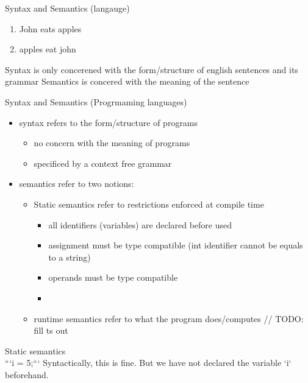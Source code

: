 \documentclass[journal, letterpaper]{IEEEtran}
\begin{document}
\begin{aside}{Syntax and Semantics (langauge)} \\
    \begin{enumerate}
        \item John eats apples
        \item apples eat john
    \end{enumerate}

    Syntax is only concerened with the form/structure of english sentences and its grammar
    Semantics is concered with the meaning of the sentence
\end{aside}

\begin{theory}{Syntax and Semantics (Progrmaming languages)}\\
    \begin{itemize}
        \item syntax refers to the form/structure of programs
        \begin{itemize}
            \item no concern with the meaning of programs
            \item specificed by a context free grammar
        \end{itemize}
    \item semantics refer to two notions:
        \begin{itemize}
            \item Static semantics refer to restrictions enforced at compile time 
                \begin{itemize}
                    \item all identifiers (variables) are declared before used 
                    \item assignment must be type compatible (int identifier cannot be
                        equals to a string)
                    \item operands must be type compatible
                    \item 
                \end{itemize}
            \item runtime semantics refer to what the program does/computes
                // TODO: fill ts out
        \end{itemize}
    \end{itemize}
\end{theory}

\begin{example}{Static semantics}\\
    ```i = 5;``` 
    Syntactically, this is fine. But we have not declared the variable `i` beforehand.
\end{example}
\end{document}

